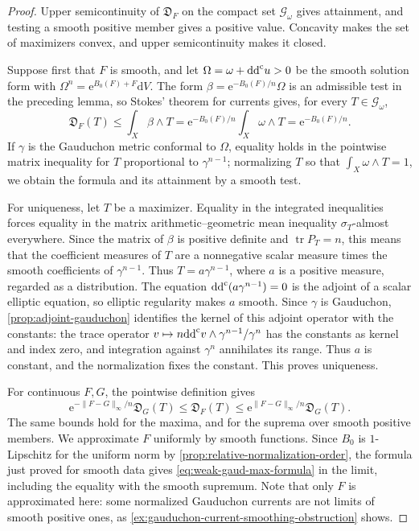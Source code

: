 \begin{proof}
Upper semicontinuity of $\mathfrak D_F$ on the compact set $\mathscr G_\omega$ gives attainment, and testing a smooth positive member gives a positive value. Concavity makes the set of maximizers convex, and upper semicontinuity makes it closed.

Suppose first that $F$ is smooth, and let $\Omega=\omega+\mathrm{dd}^{\mathrm{c}} u>0$ be the smooth solution form with $\Omega^n=\mathrm{e}^{B_0(F)+F}\mathrm{d}V$. The form $\beta=\mathrm{e}^{-B_0(F)/n}\Omega$ is an admissible test in the preceding lemma, so Stokes' theorem for currents gives, for every $T\in\mathscr G_\omega$,
\[
 \mathfrak D_F(T)\leq\int_X\beta\wedge T
  =\mathrm{e}^{-B_0(F)/n}\int_X\omega\wedge T=\mathrm{e}^{-B_0(F)/n}.
\]
If $\gamma$ is the Gauduchon metric conformal to $\Omega$, equality holds in the pointwise matrix inequality for $T$ proportional to $\gamma^{n-1}$; normalizing $T$ so that $\int_X\omega\wedge T=1$, we obtain the formula and its attainment by a smooth test.

For uniqueness, let $T$ be a maximizer. Equality in the integrated inequalities forces equality in the matrix arithmetic--geometric mean inequality $\sigma_T$-almost everywhere. Since the matrix of $\beta$ is positive definite and $\operatorname{tr}P_T=n$, this means that the coefficient measures of $T$ are a nonnegative scalar measure times the smooth coefficients of $\gamma^{n-1}$. Thus $T=a\gamma^{n-1}$, where $a$ is a positive measure, regarded as a distribution. The equation $\mathrm{dd}^{\mathrm{c}}(a\gamma^{n-1})=0$ is the adjoint of a scalar elliptic equation, so elliptic regularity makes $a$ smooth. Since $\gamma$ is Gauduchon, \cref{prop:adjoint-gauduchon} identifies the kernel of this adjoint operator with the constants: the trace operator $v\mapsto n\mathrm{dd}^{\mathrm{c}} v\wedge\gamma^{n-1}/\gamma^n$ has the constants as kernel and index zero, and integration against $\gamma^n$ annihilates its range. Thus $a$ is constant, and the normalization fixes the constant. This proves uniqueness.

For continuous $F,G$, the pointwise definition gives
\[
 \mathrm{e}^{-\|F-G\|_\infty/n}\mathfrak D_G(T)
 \leq\mathfrak D_F(T)
 \leq \mathrm{e}^{\|F-G\|_\infty/n}\mathfrak D_G(T).
\]
The same bounds hold for the maxima, and for the suprema over smooth positive members. We approximate $F$ uniformly by smooth functions. Since $B_0$ is $1$-Lipschitz for the uniform norm by \cref{prop:relative-normalization-order}, the formula just proved for smooth data gives \eqref{eq:weak-gaud-max-formula} in the limit, including the equality with the smooth supremum. Note that only $F$ is approximated here: some normalized Gauduchon currents are not limits of smooth positive ones, as \cref{ex:gauduchon-current-smoothing-obstruction} shows.
\end{proof}

